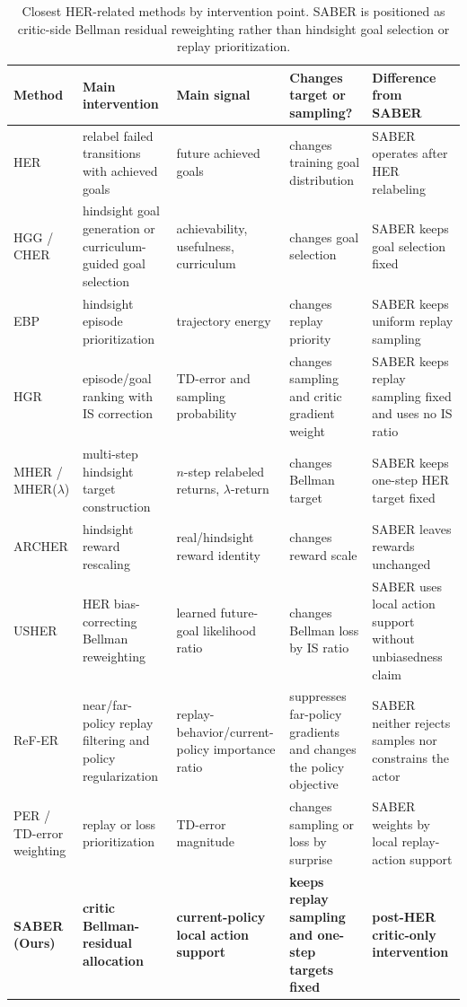 \documentclass[letterpaper]{article}
\newcommand{\ours}[1]{\textbf{#1 (Ours)}}
\newcommand{\ourscell}[1]{\textbf{#1}}
\begin{document}
\begin{table}[t]
\centering
\small
\caption{Closest HER-related methods by intervention point. SABER is positioned as critic-side Bellman residual reweighting rather than hindsight goal selection or replay prioritization.}
\label{tab:related-intervention}
\begin{tabular}{@{}p{}p{}p{}p{}p{}@{}}
\toprule
Method & Main intervention & Main signal & Changes target or sampling? & Difference from SABER \\
\midrule
HER & relabel failed transitions with achieved goals & future achieved goals & changes training goal distribution & SABER operates after HER relabeling \\
HGG / CHER & hindsight goal generation or curriculum-guided goal selection & achievability, usefulness, curriculum & changes goal selection & SABER keeps goal selection fixed \\
EBP & hindsight episode prioritization & trajectory energy & changes replay priority & SABER keeps uniform replay sampling \\
HGR & episode/goal ranking with IS correction & TD-error and sampling probability & changes sampling and critic gradient weight & SABER keeps replay sampling fixed and uses no IS ratio \\
MHER / MHER(\(\lambda\)) & multi-step hindsight target construction & \(n\)-step relabeled returns, \(\lambda\)-return & changes Bellman target & SABER keeps one-step HER target fixed \\
ARCHER & hindsight reward rescaling & real/hindsight reward identity & changes reward scale & SABER leaves rewards unchanged \\
USHER & HER bias-correcting Bellman reweighting & learned future-goal likelihood ratio & changes Bellman loss by IS ratio & SABER uses local action support without unbiasedness claim \\
ReF-ER & near/far-policy replay filtering and policy regularization & replay-behavior/current-policy importance ratio & suppresses far-policy gradients and changes the policy objective & SABER neither rejects samples nor constrains the actor \\
PER / TD-error weighting & replay or loss prioritization & TD-error magnitude & changes sampling or loss by surprise & SABER weights by local replay-action support \\
\ours{SABER} & \ourscell{critic Bellman-residual allocation} & \ourscell{current-policy local action support} & \ourscell{keeps replay sampling and one-step targets fixed} & \ourscell{post-HER critic-only intervention} \\
\bottomrule
\end{tabular}
\end{table}
\end{document}
